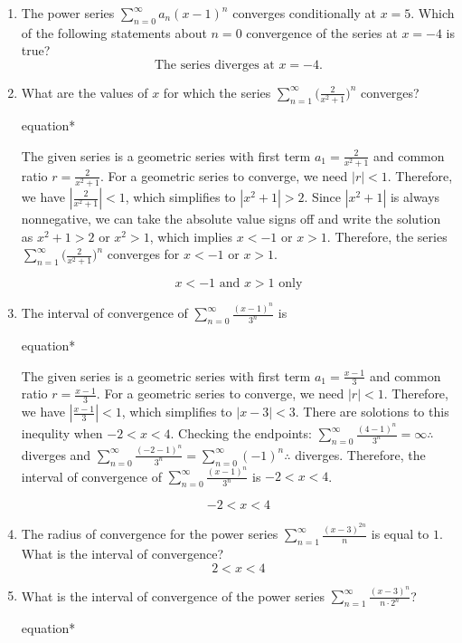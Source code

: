 \documentclass[12pt]{article}
\begin{document}
\begin{enumerate}
	\item The power series $\sum_{n=0}^{\infty} a_n (x-1)^n$ converges conditionally at $x = 5$. Which of the following statements about $n=0$ convergence of the series at $x = -4$ is true?
	      $$\boxed{\text{The series diverges at } x = -4.}$$
	\item What are the values of $x$ for which the series $\sum_{n=1}^{\infty}\big(\frac{2}{x^2+1}\big)^n$ converges?
	      \begin{empheq}[box=\tcbhighmath]{equation*}
	      	\parbox{6in}{The given series is a geometric series with first term $a_1=\frac{2}{x^2+1}$ and common ratio $r=\frac{2}{x^2+1}$. For a geometric series to converge, we need $|r|<1$. Therefore, we have $\left|\frac{2}{x^2+1}\right|<1$, which simplifies to $|x^2+1|>2$. Since $|x^2+1|$ is always nonnegative, we can take the absolute value signs off and write the solution as $x^2+1>2$ or $x^2>1$, which implies $x<-1$ or $x>1$. Therefore, the series $\sum_{n=1}^{\infty}\big(\frac{2}{x^2+1}\big)^n$ converges for $x<-1$ or $x>1$.}
	      \end{empheq}
	      $$\boxed{x < -1 \text{ and } x > 1 \text{ only}}$$
	\item The interval of convergence of $\sum_{n=0}^{\infty} \frac{(x-1)^n}{3^n}$ is 
	      \begin{empheq}[box=\tcbhighmath]{equation*}
	      	\parbox{6in}{The given series is a geometric series with first term $a_1=\frac{x-1}{3}$ and common ratio $r=\frac{x-1}{3}$. For a geometric series to converge, we need $|r|<1$. Therefore, we have $\left|\frac{x-1}{3}\right|<1$, which simplifies to $|x-3|<3$. There are solotions to this inequlity when $-2<x<4$. Checking the endpoints: $\sum_{n=0}^{\infty} \frac{(4-1)^n}{3^{n}} = \infty \therefore$ diverges and $\sum_{n=0}^{\infty} \frac{(-2-1)^n}{3^n} = \sum_{n=0}^{\infty} (-1)^n \therefore $ diverges. Therefore, the interval of convergence of $\sum_{n=0}^{\infty} \frac{(x-1)^n}{3^n}$ is $-2 < x<4$.}
	      \end{empheq}
	      $$\boxed{-2 < x<4}$$
	\item The radius of convergence for the power series $\sum_{n=1}^{\infty} \frac{(x-3)^{2n}}{n}$ is equal to $1$. What is the interval of convergence?
	      $$\boxed{2 < x < 4}$$
	\item What is the interval of convergence of the power series $\sum_{n=1}^{\infty} \frac{(x-3)^n}{n \cdot 2^n}$?
	      \begin{empheq}[box=\tcbhighmath]{equation*}

\end{empheq}
\end{enumerate}
\end{document}
